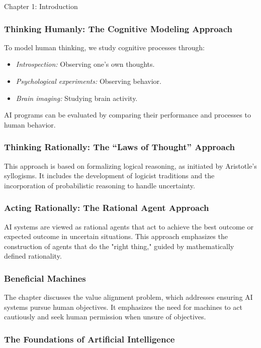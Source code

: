 \begin{notes}{Chapter 1: Introduction}
    \subsubsection*{Thinking Humanly: The Cognitive Modeling Approach}

    To model human thinking, we study cognitive processes through:
    \begin{itemize}
        \item \textit{Introspection:} Observing one's own thoughts.
        \item \textit{Psychological experiments:} Observing behavior.
        \item \textit{Brain imaging:} Studying brain activity.
    \end{itemize}
    AI programs can be evaluated by comparing their performance and processes to human behavior.

    \subsubsection*{Thinking Rationally: The “Laws of Thought” Approach}

    This approach is based on formalizing logical reasoning, as initiated by Aristotle’s syllogisms. It includes the development of logicist traditions and the incorporation of probabilistic reasoning 
    to handle uncertainty.

    \subsubsection*{Acting Rationally: The Rational Agent Approach}

    AI systems are viewed as rational agents that act to achieve the best outcome or expected outcome in uncertain situations. This approach emphasizes the construction of agents that do the "right thing," 
    guided by mathematically defined rationality.

    \subsubsection*{Beneficial Machines}

    The chapter discusses the value alignment problem, which addresses ensuring AI systems pursue human objectives. It emphasizes the need for machines to act cautiously and seek human permission when 
    unsure of objectives.

    \subsubsection*{The Foundations of Artificial Intelligence}


\end{notes}
